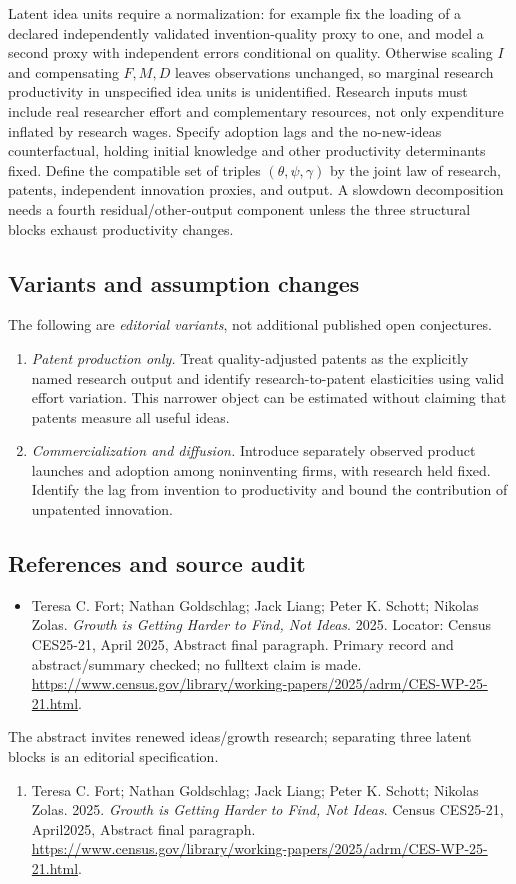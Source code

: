 \documentclass[11pt,a4paper]{article}
\begin{document}
Latent idea units require a normalization: for example fix the loading of a declared independently validated invention-quality proxy to one, and model a second proxy with independent errors conditional on quality. Otherwise scaling \(I\) and compensating \(F,M,D\) leaves observations unchanged, so marginal research productivity in unspecified idea units is unidentified. Research inputs must include real researcher effort and complementary resources, not only expenditure inflated by research wages. Specify adoption lags and the no-new-ideas counterfactual, holding initial knowledge and other productivity determinants fixed. Define the compatible set of triples \((\theta,\psi,\gamma)\) by the joint law of research, patents, independent innovation proxies, and output. A slowdown decomposition needs a fourth residual/other-output component unless the three structural blocks exhaust productivity changes.
\subsection*{Variants and assumption changes}
The following are \emph{editorial variants}, not additional published open conjectures.
\begin{enumerate}
\item \emph{Patent production only.} Treat quality-adjusted patents as the explicitly named research output and identify research-to-patent elasticities using valid effort variation. This narrower object can be estimated without claiming that patents measure all useful ideas.
\item \emph{Commercialization and diffusion.} Introduce separately observed product launches and adoption among noninventing firms, with research held fixed. Identify the lag from invention to productivity and bound the contribution of unpatented innovation.
\end{enumerate}
\subsection*{References and source audit}
\begin{itemize}
\item Teresa C. Fort; Nathan Goldschlag; Jack Liang; Peter K. Schott; Nikolas Zolas. \emph{Growth is Getting Harder to Find, Not Ideas}. 2025. Locator: Census CES25-21, April 2025, Abstract final paragraph. Primary record and abstract/summary checked; no fulltext claim is made. \url{https://www.census.gov/library/working-papers/2025/adrm/CES-WP-25-21.html}.
\end{itemize}
The abstract invites renewed ideas/growth research; separating three latent blocks is an editorial specification.
\begin{enumerate}\raggedright
\item\hypertarget{definitions:source:30007542:1}{} Teresa C. Fort; Nathan Goldschlag; Jack Liang; Peter K. Schott; Nikolas Zolas. 2025. \emph{Growth is Getting Harder to Find, Not Ideas}. Census CES25-21, April2025, Abstract final paragraph.
\url{https://www.census.gov/library/working-papers/2025/adrm/CES-WP-25-21.html}.
\end{enumerate}
\end{document}
